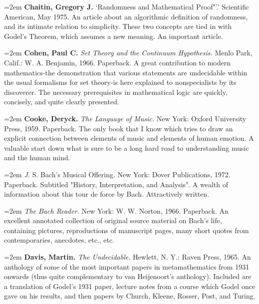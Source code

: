 \par\noindent\hangindent=2em {\bf Chaitin, Gregory J.} `Randomness and Mathematical Proof"'.' Scientific American, May 1975. An article about an algorithmic definition of randomness, and its intimate relation to simplicity. These two concepts are tied in with Godel's Theorem, which assumes a new meaning. An important article.

\par\noindent\hangindent=2em {\bf Cohen, Paul C.} {\it Set Theory and the Continuum Hypothesis.} Menlo Park, Calif.: W. A. Benjamin, 1966. Paperback. A great contribution to modern mathematics-the demonstration that various statements are undecidable within the usual formalisms for set theory-is here explained to nonspecialists by its discoverer. The necessary prerequisites in mathematical logic are quickly, concisely, and quite clearly presented.

\par\noindent\hangindent=2em {\bf Cooke, Deryck.} {\it The Language of Music.} New York: Oxford University Press, 1959. Paperback. The only book that I know which tries to draw an explicit connection between elements of music and elements of human emotion. A valuable start down what is sure to be a long hard road to understanding music and the human mind.

\par\noindent\hangindent=2em  {\it J.} S. Bach's Musical Offering. New York: Dover Publications, 1972. Paperback. Subtitled "History, Interpretation, and Analysis". A wealth of information about this tour de force by Bach. Attractively written.

\par\noindent\hangindent=2em  {\it The Bach Reader.} New York: W. W. Norton, 1966. Paperback. An excellent annotated collection of original source material on Bach's life, containing pictures, reproductions of manuscript pages, many short quotes from contemporaries, anecdotes, etc., etc.

\par\noindent\hangindent=2em {\bf Davis, Martin.} {\it The Undecidable.} Hewlett, N. Y.: Raven Press, 1965. An anthology of some of the most important papers in metamathematics from 1931 onwards (thus quite complementary to van Heijenoort's anthology). Included are a translation of Godel's 1931 paper, lecture notes from a course which Godel once gave on his results, and then papers by Church, Kleene, Rosser, Post, and Turing.

